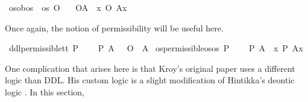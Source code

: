 \begin{isabellebody}
\isamarkupfalse%
\ os{\isacharunderscore}ob{\isacharcolon}{\isacharcolon}{\isachardoublequoteopen}os\ {\isasymRightarrow}\ os{\isachardoublequoteclose}\ {\isacharparenleft}{\isachardoublequoteopen}\isactrlemph O{\isacharbraceleft}{\isacharunderscore}{\isacharbraceright}{\isachardoublequoteclose}{\isacharparenright}\isanewline
\ \ \ {\isachardoublequoteopen}\isactrlemph O{\isacharbraceleft}A{\isacharbraceright}\ {\isasymequiv}\ {\isasymlambda}x{\isachardot}\ {\isacharparenleft}O\ {\isacharbraceleft}A{\isacharparenleft}x{\isacharparenright}{\isacharbraceright}{\isacharparenright}{\isachardoublequoteclose}%
\begin{isamarkuptext}%
Once again, the notion of permissibility will be useful here.%
\end{isamarkuptext}\isamarkuptrue%
\isamarkupfalse%
\ ddl{\isacharunderscore}permissible{\isacharcolon}{\isacharcolon}{\isachardoublequoteopen}t{\isasymRightarrow}t{\isachardoublequoteclose}\ {\isacharparenleft}{\isachardoublequoteopen}P\ {\isacharbraceleft}{\isacharunderscore}{\isacharbraceright}{\isachardoublequoteclose}{\isacharparenright}\isanewline
\ \ \ {\isachardoublequoteopen}P\ {\isacharbraceleft}A{\isacharbraceright}\ {\isasymequiv}\ \isactrlbold {\isasymnot}\ {\isacharparenleft}O\ {\isacharbraceleft}\isactrlbold {\isasymnot}\ A{\isacharbraceright}{\isacharparenright}{\isachardoublequoteclose}\isanewline
{}\isamarkupfalse%
\ os{\isacharunderscore}permissible{\isacharcolon}{\isacharcolon}{\isachardoublequoteopen}os{\isasymRightarrow}os{\isachardoublequoteclose}\ {\isacharparenleft}{\isachardoublequoteopen}\isactrlemph P\ {\isacharbraceleft}{\isacharunderscore}{\isacharbraceright}{\isachardoublequoteclose}{\isacharparenright}\isanewline
\ \ \ {\isachardoublequoteopen}\isactrlemph P\ {\isacharbraceleft}A{\isacharbraceright}\ {\isasymequiv}\ {\isasymlambda}x{\isachardot}\ P\ {\isacharbraceleft}A{\isacharparenleft}x{\isacharparenright}{\isacharbraceright}{\isachardoublequoteclose}%
\isadelimdocument
%
\endisadelimdocument
%
\isatagdocument
%
\isamarkuptrue%
%
\endisatagdocument
{\isafolddocument}%
%
\isadelimdocument
%
\endisadelimdocument
%
\begin{isamarkuptext}%
One complication that arises here is that Kroy's original paper uses a different logic than DDL. 
His custom logic is a slight modification of Hintikka's deontic logic \cite{hintikka}. In this section, 

\end{isamarkuptext}
\end{isabellebody}
